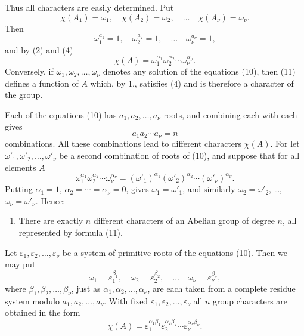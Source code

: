 \documentclass[11pt]{article}
\begin{document}
Thus all characters are easily determined. Put
\begin{equation}
\chi(A_1)=\omega_1,
\quad \chi(A_2)=\omega_2,
\quad\ldots\quad
\chi(A_\nu)=\omega_\nu.
\tag{9}
\end{equation}
Then
\begin{equation}
\omega_1^{a_1}=1,
\quad \omega_2^{a_2}=1,
\quad\ldots\quad
\omega_\nu^{a_\nu}=1,
\tag{10}
\end{equation}
and by (2) and (4)
\begin{equation}
\chi(A)=\omega_1^{\alpha_1}\omega_2^{\alpha_2}\cdots\omega_\nu^{\alpha_\nu}.
\tag{11}
\end{equation}
Conversely, if $\omega_1,\omega_2,
\ldots,
\omega_\nu$ denotes any solution of the equations (10), then (11) defines a function of $A$ which, by 1., satisfies (4) and is therefore a character of the group.

Each of the equations (10) has $a_1,a_2,
\ldots,a_\nu$ roots, and combining each with each gives
\[
a_1a_2\cdots a_\nu=n
\]
combinations. All these combinations lead to different characters $\chi(A)$. For let $\omega'_1,\omega'_2,
\ldots,
\omega'_\nu$ be a second combination of roots of (10), and suppose that for all elements $A$
\[
\omega_1^{\alpha_1}\omega_2^{\alpha_2}\cdots\omega_\nu^{\alpha_\nu}
=(\omega'_1)^{\alpha_1}(\omega'_2)^{\alpha_2}\cdots(\omega'_\nu)^{\alpha_\nu}.
\]
Putting $\alpha_1=1$, $\alpha_2=\cdots=\alpha_\nu=0$, gives $\omega_1=\omega'_1$, and similarly $\omega_2=\omega'_2$, \ldots, $\omega_\nu=\omega'_\nu$. Hence:

\begin{enumerate}[resume,label=\arabic*.]
\item There are exactly $n$ different characters of an Abelian group of degree $n$, all represented by formula (11).
\end{enumerate}

Let $\varepsilon_1,\varepsilon_2,
\ldots,\varepsilon_\nu$ be a system of primitive roots of the equations (10). Then we may put
\begin{equation}
\omega_1=\varepsilon_1^{\beta_1},
\quad \omega_2=\varepsilon_2^{\beta_2},
\quad\ldots\quad
\omega_\nu=\varepsilon_\nu^{\beta_\nu},
\tag{12}
\end{equation}
where $\beta_1,\beta_2,
\ldots,
\beta_\nu$, just as $\alpha_1,\alpha_2,
\ldots,
\alpha_\nu$, are each taken from a complete residue system modulo $a_1,a_2,
\ldots,a_\nu$. With fixed $\varepsilon_1,\varepsilon_2,
\ldots,
\varepsilon_\nu$ all $n$ group characters are obtained in the form
\begin{equation}
\chi(A)=\varepsilon_1^{\alpha_1\beta_1}
\varepsilon_2^{\alpha_2\beta_2}
\cdots
\varepsilon_\nu^{\alpha_\nu\beta_\nu}.
\tag{13}
\end{equation}
\end{document}
